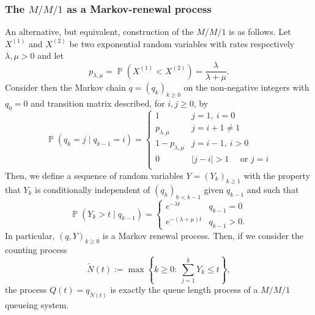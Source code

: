 \documentclass[]{amsart}
\numberwithin{equation}{section}
\theoremstyle{remark}
\theoremstyle{definition}
\DeclareMathOperator{\bP}{\mathbb{P}}
\begin{document}
\subsubsection{The $M/M/1$ as a Markov-renewal process}\label{sec:MRP}
{An alternative, but equivalent, construction of the $M/M/1$ is as follows. Let $X^{(1)}$ and $X^{(2)}$ be two exponential random variables with rates respectively $\lambda,\mu>0$ and let
\begin{equation}\label{mindist}	
p_{\lambda,\mu}=\bP(X^{(1)}<X^{(2)})=\frac{\lambda}{\lambda+\mu}.
\end{equation}
Consider then the Markov chain $q=(q_k)_{k \ge 0}$ on the non-negative integers with $q_0=0$ and transition matrix described, for $i,j \ge 0$, by
\begin{equation}\label{eq:mCren1}
	\bP(q_k=j \mid q_{k-1}=i)=\begin{cases}
		1 & j=1, \ i=0 \\
		p_{\lambda,\mu} & j=i+1 \not = 1 \\
		1-p_{\lambda,\mu} & j=i-1, \ i>0\\
		0 & |j-i|>1 \quad \mbox{ or } j=i \\
	\end{cases}
\end{equation}
Then, we define a sequence of random variables $Y=(Y_k)_{k \ge 1}$ with the property that $Y_k$ is conditionally independent of $(q_h)_{h<k-1}$ given $q_{k-1}$ and such that
\begin{equation}\label{eq:Y1}
	\bP(Y_k>t\mid q_{k-1})=\begin{cases} e^{-\lambda t} & q_{k-1}=0 \\
		e^{-(\lambda+\mu)t} & q_{k-1}>0.
	\end{cases}
\end{equation}
In particular, $(q,Y)_{k \ge 0}$ is a Markov renewal process. Then, if we consider the counting process
\begin{equation}\label{eq:countingproc}
	\widetilde{N}(t):=\max\left\{k \ge 0: \ \sum_{j=1}^{k}Y_k \le t\right\},
\end{equation}
the process $Q(t)=q_{\widetilde{N}(t)}$ is exactly the queue length process of a $M/M/1$ queueing system.}
\end{document}
